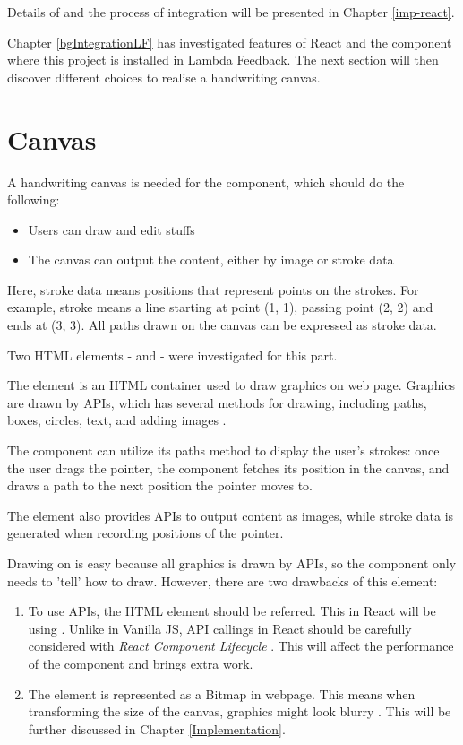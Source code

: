 \documentclass[12pt,twoside]{report}
\begin{document}
Details of  and the process of integration will be presented in Chapter \ref{imp-react}.

Chapter \ref{bgIntegrationLF} has investigated features of React and the
component where this project is installed in Lambda Feedback. The next section
will then discover different choices to realise a handwriting canvas.


\section{Canvas}
\label{bgCanvas}
A handwriting canvas is needed for the component, which should do the following:
\begin{itemize}
    \item Users can draw and edit stuffs
    \item The canvas can output the content, either by image or stroke data
\end{itemize}
Here, stroke data means positions that represent points on the strokes. For
example, stroke  means a line starting at point (1, 1), passing point (2, 2) and ends at (3, 3). All paths drawn on the canvas can be expressed as stroke data.

Two HTML elements -  and  - were investigated for this part.

The  element is an HTML container used
to draw graphics on web page. Graphics are drawn by APIs, which has several
methods for drawing, including paths, boxes, circles, text, and adding images
\cite{webcanvas}. 

The component can utilize its paths method to display the user's strokes: once the user drags the pointer, the component fetches its position in the canvas, and draws a path to the next position the pointer moves to. 

The  element also provides APIs to output content as images, while stroke data is generated when recording positions of the pointer.

Drawing on  is easy because all graphics is drawn by APIs, so the component only needs to 'tell'  how to draw. However, there are two drawbacks of this element: 
\begin{enumerate}
    \item To use  APIs, the HTML element should be referred. This in React will be using . Unlike in Vanilla JS, API callings in React should be carefully considered with \textit{React Component Lifecycle} \cite{webreactlife}. This will affect the performance of the component and brings extra work.
    \item The  element is represented as a Bitmap in webpage. This means when transforming the size of the canvas, graphics might look blurry \cite{webcanvasvssvg}. This will be further discussed in Chapter \ref{Implementation}.
\end{enumerate}
\end{document}
